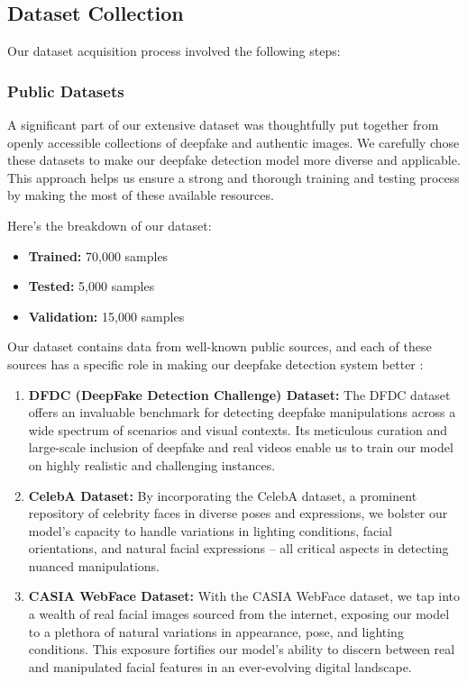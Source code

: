 \subsection{Dataset Collection}

\noindent Our dataset acquisition process involved the following steps:


\subsubsection{Public Datasets}
A significant part of our extensive dataset was thoughtfully put together from openly accessible collections of deepfake and authentic images. We carefully chose these datasets to make our deepfake detection model more diverse and applicable. This approach helps us ensure a strong and thorough training and testing process by making the most of these available resources.

Here's the breakdown of our dataset:
\begin{itemize}
    \item \textbf{Trained:} 70,000 samples
    \item \textbf{Tested:} 5,000 samples
    \item \textbf{Validation:} 15,000 samples
\end{itemize}
Our dataset contains data from well-known public sources, and each of these sources has a specific role in making our deepfake detection system better :

\begin{enumerate}
    \item \textbf{DFDC (DeepFake Detection Challenge) Dataset:} The DFDC dataset offers an invaluable benchmark for detecting deepfake manipulations across a wide spectrum of scenarios and visual contexts. Its meticulous curation and large-scale inclusion of deepfake and real videos enable us to train our model on highly realistic and challenging instances.

    \item \textbf{CelebA Dataset:} By incorporating the CelebA dataset, a prominent repository of celebrity faces in diverse poses and expressions, we bolster our model's capacity to handle variations in lighting conditions, facial orientations, and natural facial expressions – all critical aspects in detecting nuanced manipulations.

    \item \textbf{CASIA WebFace Dataset:} With the CASIA WebFace dataset, we tap into a wealth of real facial images sourced from the internet, exposing our model to a plethora of natural variations in appearance, pose, and lighting conditions. This exposure fortifies our model's ability to discern between real and manipulated facial features in an ever-evolving digital landscape.
\end{enumerate}


